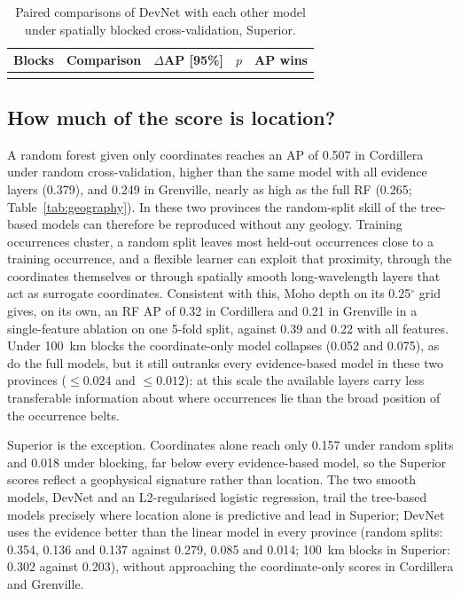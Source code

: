 \documentclass[pdflatex,sn-apa]{sn-jnl}
\begin{document}
\begin{table}[t]
\caption{Paired comparisons of DevNet with each other model under spatially blocked cross-validation, Superior.}\label{tab:spatial-boot}
\footnotesize
\begin{tabular*}{\textwidth}{@{\extracolsep\fill}llccc}
\toprule
Blocks & Comparison & $\Delta$AP [95\%] & $p$ & AP wins \\
\midrule
\botrule
\end{tabular*}
\end{table}

\subsection{How much of the score is location?}\label{sec:res-geography}

A random forest given only coordinates reaches an AP of 0.507 in Cordillera under random cross-validation, higher than the same model with all evidence layers (0.379), and 0.249 in Grenville, nearly as high as the full RF (0.265; Table~\ref{tab:geography}). In these two provinces the random-split skill of the tree-based models can therefore be reproduced without any geology. Training occurrences cluster, a random split leaves most held-out occurrences close to a training occurrence, and a flexible learner can exploit that proximity, through the coordinates themselves or through spatially smooth long-wavelength layers that act as surrogate coordinates. Consistent with this, Moho depth on its 0.25$^\circ$ grid gives, on its own, an RF AP of 0.32 in Cordillera and 0.21 in Grenville in a single-feature ablation on one 5-fold split, against 0.39 and 0.22 with all features. Under 100~km blocks the coordinate-only model collapses (0.052 and 0.075), as do the full models, but it still outranks every evidence-based model in these two provinces ($\leq 0.024$ and $\leq 0.012$): at this scale the available layers carry less transferable information about where occurrences lie than the broad position of the occurrence belts.

Superior is the exception. Coordinates alone reach only 0.157 under random splits and 0.018 under blocking, far below every evidence-based model, so the Superior scores reflect a geophysical signature rather than location. The two smooth models, DevNet and an L2-regularised logistic regression, trail the tree-based models precisely where location alone is predictive and lead in Superior; DevNet uses the evidence better than the linear model in every province (random splits: 0.354, 0.136 and 0.137 against 0.279, 0.085 and 0.014; 100~km blocks in Superior: 0.302 against 0.203), without approaching the coordinate-only scores in Cordillera and Grenville.
\end{document}
